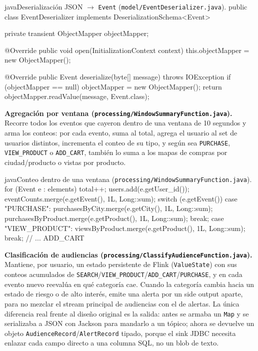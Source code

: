 \begin{sourcecode}[\label{code:deserializer}]{java}{Deserialización JSON $\to$ \texttt{Event} (\texttt{model/EventDeserializer.java}).}
public class EventDeserializer implements DeserializationSchema<Event> {
    private transient ObjectMapper objectMapper;

    @Override
    public void open(InitializationContext context) {
        this.objectMapper = new ObjectMapper();
    }

    @Override
    public Event deserialize(byte[] message) throws IOException {
        if (objectMapper == null) {
            objectMapper = new ObjectMapper();
        }
        return objectMapper.readValue(message, Event.class);
    }
}
\end{sourcecode}

\textbf{Agregación por ventana (\texttt{processing/WindowSummaryFunction.java}).} Recorre todos los eventos que cayeron dentro de una ventana de 10 segundos y arma los conteos: por cada evento, suma al total, agrega el usuario al set de usuarios distintos, incrementa el conteo de su tipo, y según sea \texttt{PURCHASE}, \texttt{VIEW\_PRODUCT} o \texttt{ADD\_CART}, también lo suma a los mapas de compras por ciudad/producto o vistas por producto.

\begin{sourcecode}[\label{code:windowsummary-fn}]{java}{Conteo dentro de una ventana (\texttt{processing/WindowSummaryFunction.java}).}
for (Event e : elements) {
    total++;
    users.add(e.getUser_id());
    eventCounts.merge(e.getEvent(), 1L, Long::sum);
    switch (e.getEvent()) {
        case "PURCHASE":
            purchasesByCity.merge(e.getCity(), 1L, Long::sum);
            purchasesByProduct.merge(e.getProduct(), 1L, Long::sum);
            break;
        case "VIEW_PRODUCT":
            viewsByProduct.merge(e.getProduct(), 1L, Long::sum);
            break;
        // ... ADD_CART
    }
}
\end{sourcecode}

\textbf{Clasificación de audiencias (\texttt{processing/ClassifyAudienceFunction.java}).} Mantiene, por usuario, un estado persistente de Flink (\texttt{ValueState}) con sus conteos acumulados de \texttt{SEARCH}/\texttt{VIEW\_PRODUCT}/\texttt{ADD\_CART}/\texttt{PURCHASE}, y en cada evento nuevo reevalúa en qué categoría cae. Cuando la categoría cambia hacia un estado de riesgo o de alto interés, emite una alerta por un side output aparte, para no mezclar el stream principal de audiencias con el de alertas. La única diferencia real frente al diseño original es la salida: antes se armaba un \texttt{Map} y se serializaba a JSON con Jackson para mandarlo a un tópico; ahora se devuelve un objeto \texttt{AudienceRecord}/\texttt{AlertRecord} tipado, porque el sink JDBC necesita enlazar cada campo directo a una columna SQL, no un blob de texto.

